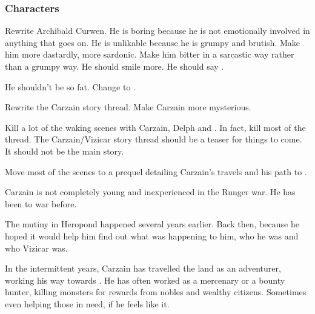 \subsubsection{Characters}
\begin{changes}
  \begin{comment}\paragraph{Archibald Curwen}\end{comment}
    Rewrite Archibald Curwen. 
    He is boring because he is not emotionally involved in anything that goes on. 
    He is unlikable because he is grumpy and brutish. 
    Make him more dastardly, more sardonic. 
    Make him bitter in a sarcastic way rather than a grumpy way. 
    He should smile more. 
    He should say \quo{\Mister \Shireyo}. 
    
    He shouldn't be so fat. 
    Change  to . 
  
  \begin{comment}
  \paragraph{Carzain}
  \end{comment}
    Rewrite the Carzain story thread. 
    Make Carzain more mysterious. 
    
    Kill a lot of the waking scenes with Carzain, Delph and \Tsekkect. 
    In fact, kill most of the thread. 
    The Carzain/Vizicar story thread should be a teaser for things to come.
    It should not be the main story. 
    
    Move most of the scenes to a prequel detailing Carzain's travels and his path to \kenosis. 
    
    Carzain is not completely young and inexperienced in the Runger war. 
    He has been to war before. 
    
    The mutiny in Heropond happened several years earlier. 
    Back then,  because he hoped it would help him find out what was happening to him, who he was and who Vizicar was. 
    
    In the intermittent years, Carzain has travelled the land as an adventurer, working his way towards \kenosis. 
    He has often worked as a mercenary or a bounty hunter, killing monsters for rewards from nobles and wealthy citizens. 
    Sometimes even helping those in need, if he feels like it. 
    

\end{changes}
